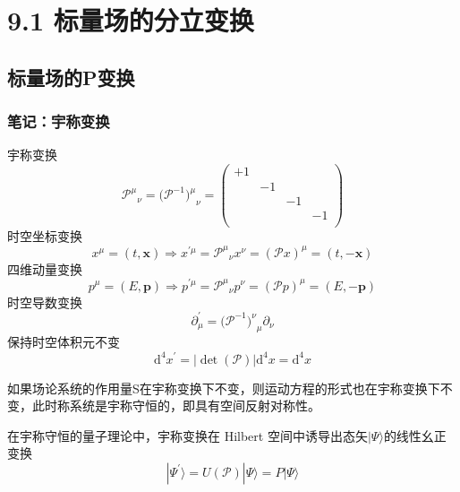 \section{9.1 标量场的分立变换}
\subsection{标量场的P变换}

\subsubsection{笔记：宇称变换}
宇称变换
\begin{equation}
    {\mathcal{P} ^{\mu}}_{\nu}=(\mathcal{P} ^{-1}{)^{\mu}}_{\nu}=\left( \begin{matrix}
	+1&		&		&		\\
	&		-1&		&		\\
	&		&		-1&		\\
	&		&		&		-1\\
\end{matrix} \right) 
\end{equation}
时空坐标变换
\begin{equation}
    x^{\mu}=\left( t,\mathbf{x} \right) \Rightarrow x^{\prime \mu}={\mathcal{P} ^{\mu}}_{\nu}x^{\nu}=(\mathcal{P} x)^{\mu}=\left( t,-\mathbf{x} \right) 
\end{equation}
四维动量变换
\begin{equation}
    p^{\mu}=\left( E,\mathbf{p} \right) \Rightarrow p^{\prime \mu}={\mathcal{P} ^{\mu}}_{\nu}p^{\nu}=(\mathcal{P} p)^{\mu}=\left( E,-\mathbf{p} \right) 
\end{equation}
时空导数变换
\begin{equation}
    \partial _{\mu}^{\prime}=(\mathcal{P} ^{-1}{)^{\nu}}_{\mu}\partial _{\nu}
\end{equation}
保持时空体积元不变
\begin{equation}
    \mathrm{d}^4x^{\prime}=\left| \det \left( \mathcal{P} \right) \right|\mathrm{d}^4x=\mathrm{d}^4x
\end{equation}

如果场论系统的作用量S在宇称变换下不变，则运动方程的形式也在宇称变换下不变，此时称系统是宇称守恒的，即具有空间反射对称性。


在宇称守恒的量子理论中，宇称变换在 Hilbert 空间中诱导出态矢$|\Psi \rangle$的线性幺正变换
\begin{equation}
    |\Psi ^{\prime}\rangle =U(\mathcal{P} )|\Psi \rangle =P|\Psi \rangle 
\end{equation}


